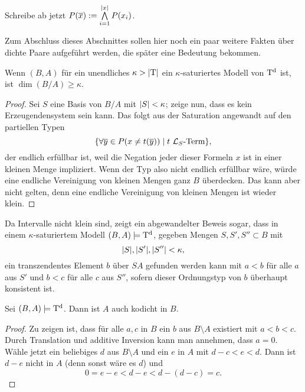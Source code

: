 \begin{definition}
	Schreibe ab jetzt $P(\overline{x}):=\bigwedge\limits_{i=1}^{\left| x \right|}P(x_i)$.
\end{definition}

\newpage

Zum Abschluss dieses Abschnittes sollen hier noch ein paar weitere Fakten über dichte Paare aufgeführt werden, die später eine Bedeutung bekommen.

\begin{lemma}
	Wenn $(B,A)$ für ein unendliches $\kappa>{\left| \operatorname{T} \right|}$ ein $\kappa$-saturiertes Modell von $\operatorname{T^d}$ ist, ist $\dim(B/A)\geq\kappa$.
\end{lemma}
\begin{proof}
	Sei $S$ eine Basis von $B/A$ mit ${\left| S \right|}<\kappa$; zeige nun, dass es kein Erzeugendensystem sein kann. Das folgt aus der Saturation angewandt auf den partiellen Typen $$\{\forall\overline{y}\in P(x\neq t(\overline{y}))\mid t\ \mathcal{L}_S\text{-Term}\},$$ der endlich erfüllbar ist, weil die Negation jeder dieser Formeln \glqq{}$x$ ist in einer kleinen Menge\grqq{} impliziert. Wenn der Typ also nicht endlich erfüllbar wäre, würde eine endliche Vereinigung von kleinen Mengen ganz $B$ überdecken. Das kann aber nicht gelten, denn eine endliche Vereinigung von kleinen Mengen ist wieder klein.
\end{proof}

\begin{corollary}\label{Finden transz Elte}
	Da Intervalle nicht klein sind, zeigt ein abgewandelter Beweis sogar, dass in einem $\kappa$-saturiertem Modell $(B,A)\models\operatorname{T^d}$, gegeben Mengen $S,S',S''\subset B$ mit $${\left| S \right|},{\left| S' \right|},{\left| S'' \right|}<\kappa,$$ ein transzendentes Element $b$ über $SA$ gefunden werden kann mit $a<b$ für alle $a$ aus $S'$ und $b<c$ für alle $c$ aus $S''$, sofern dieser Ordnungstyp von $b$ überhaupt konsistent ist.
\end{corollary}

\begin{lemma}\label{Kodichte von A}
	Sei $(B,A)\models\operatorname{T^d}$. Dann ist $A$ auch kodicht in $B$.
\end{lemma}
\begin{proof}
	Zu zeigen ist, dass für alle $a,c$ in $B$ ein $b$ aus $B\setminus A$ existiert mit $a<b<c$. Durch Translation und additive Inversion kann man annehmen, dass $a=0$. Wähle jetzt ein beliebiges $d$ aus $B\setminus A$ und ein $e$ in $A$ mit $d-c<e<d$. Dann ist $d-e$ nicht in $A$ (denn sonst wäre es $d$) und $$0=e-e<d-e<d-(d-c)=c.$$
\end{proof}

